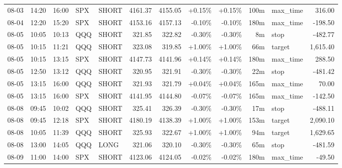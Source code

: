 \documentclass[11pt,a4paper,twoside]{article}
\begin{document}
\begin{center}
\begin{longtable}{>{\color{txtmain}}l l l l l r r r r r >{\color{txtmain}}l r}
08-03 & 14:20 & 16:00 & SPX & SHORT & 4161.37 & 4155.05 & \textcolor{wingreen}{+0.15\%} & \textcolor{wingreen}{+0.15\%} & 100m & max\_time & \textcolor{wingreen}{316.00} \\
08-04 & 12:20 & 15:20 & SPX & SHORT & 4153.16 & 4157.13 & \textcolor{lossred}{-0.10\%} & \textcolor{lossred}{-0.10\%} & 180m & max\_time & \textcolor{lossred}{-198.50} \\
08-05 & 10:05 & 10:13 & QQQ & SHORT & 321.85 & 322.82 & \textcolor{lossred}{-0.30\%} & \textcolor{lossred}{-0.30\%} & 8m & stop & \textcolor{lossred}{-482.77} \\
08-05 & 10:15 & 11:21 & QQQ & SHORT & 323.08 & 319.85 & \textcolor{wingreen}{+1.00\%} & \textcolor{wingreen}{+1.00\%} & 66m & target & \textcolor{wingreen}{1,615.40} \\
08-05 & 10:15 & 13:15 & SPX & SHORT & 4147.73 & 4141.96 & \textcolor{wingreen}{+0.14\%} & \textcolor{wingreen}{+0.14\%} & 180m & max\_time & \textcolor{wingreen}{288.50} \\
08-05 & 12:50 & 13:12 & QQQ & SHORT & 320.95 & 321.91 & \textcolor{lossred}{-0.30\%} & \textcolor{lossred}{-0.30\%} & 22m & stop & \textcolor{lossred}{-481.42} \\
08-05 & 13:15 & 16:00 & QQQ & SHORT & 321.93 & 321.79 & \textcolor{wingreen}{+0.04\%} & \textcolor{wingreen}{+0.04\%} & 165m & max\_time & \textcolor{wingreen}{70.00} \\
08-05 & 13:15 & 16:00 & SPX & SHORT & 4141.95 & 4144.80 & \textcolor{lossred}{-0.07\%} & \textcolor{lossred}{-0.07\%} & 165m & max\_time & \textcolor{lossred}{-142.50} \\
08-08 & 09:45 & 10:02 & QQQ & SHORT & 325.41 & 326.39 & \textcolor{lossred}{-0.30\%} & \textcolor{lossred}{-0.30\%} & 17m & stop & \textcolor{lossred}{-488.11} \\
08-08 & 09:45 & 12:18 & SPX & SHORT & 4180.19 & 4138.39 & \textcolor{wingreen}{+1.00\%} & \textcolor{wingreen}{+1.00\%} & 153m & target & \textcolor{wingreen}{2,090.10} \\
08-08 & 10:05 & 11:39 & QQQ & SHORT & 325.93 & 322.67 & \textcolor{wingreen}{+1.00\%} & \textcolor{wingreen}{+1.00\%} & 94m & target & \textcolor{wingreen}{1,629.65} \\
08-08 & 13:00 & 14:05 & QQQ & LONG & 321.06 & 320.10 & \textcolor{lossred}{-0.30\%} & \textcolor{lossred}{-0.30\%} & 65m & stop & \textcolor{lossred}{-481.59} \\
08-09 & 11:00 & 14:00 & SPX & SHORT & 4123.06 & 4124.05 & \textcolor{lossred}{-0.02\%} & \textcolor{lossred}{-0.02\%} & 180m & max\_time & \textcolor{lossred}{-49.50} \\

\end{longtable}
\end{center}
\end{document}
